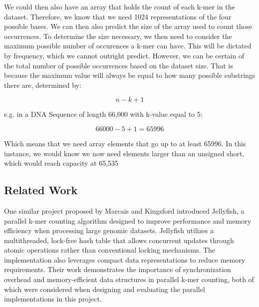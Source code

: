 \documentclass{article}
\begin{document}
\vspace{\baselineskip}

We could then also have an array that holds the count of each k-mer in the dataset. Therefore, we know that we  
need 1024 representations of the four possible bases. We can then also predict the size of the array used to count those  
occurrences. To determine the size necessary, we then need to consider the maximum possible number of occurences  
a k-mer can have. This will be dictated by frequency, which we cannot outright predict. However, we  
can be certain of the total number of possible occurrences based on the dataset size. That is because the maximum  
value will always be equal to how many possible substrings there are, determined by:

\vspace{\baselineskip}

\[
n - k + 1
\]

\vspace{\baselineskip}

e.g. in a DNA Sequence of length 66,000 with k-value equal to 5:

\vspace{\baselineskip}

\[
66000 - 5 + 1 = 65996
\]

\vspace{\baselineskip}

Which means that we need array elements that go up to at least 65996. In this instance, we would know we now need  
elements larger than an unsigned short, which would reach capacity at 65,535

\vspace{\baselineskip}

\subsection{Related Work}

\vspace{\baselineskip}

One similar project proposed by Marcais and Kingsford \cite{marcais2011jellyfish} introduced Jellyfish, a parallel k-mer counting 
algorithm designed to improve performance and memory efficiency when processing large genomic datasets. Jellyfish utilizes a
multithreaded, lock-free hash table that allows concurrent updates through atomic operations rather than conventional
locking mechanisms. The implementation also leverages compact data representations to reduce memory requirements. Their work demonstrates 
the importance of synchronization overhead and memory-efficient data structures in parallel k-mer counting, both of which were 
considered when designing and evaluating the parallel implementations in this project.
\end{document}
